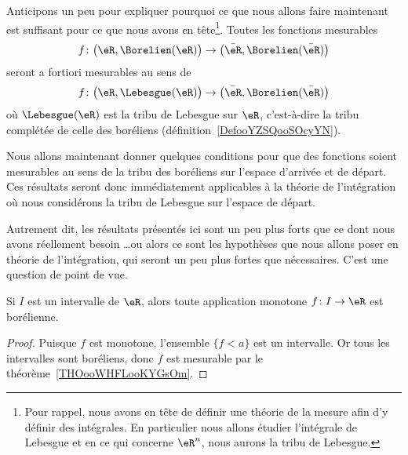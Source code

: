 \begin{normaltext}      \label{NORMooNFOMooYnaflN}
	Anticipons un peu pour expliquer pourquoi ce que nous allons faire maintenant est suffisant pour ce que nous avons en tête\footnote{Pour rappel, nous avons en tête de définir une théorie de la mesure afin d'y définir des intégrales. En particulier nous allons étudier l'intégrale de Lebesgue et en ce qui concerne \( \eR^n\), nous aurons la tribu de Lebesgue.}. Toutes les fonctions mesurables
	\begin{equation}
		f\colon \big( \eR,\Borelien(\eR) \big)\to \big( \bar\eR,\Borelien(\bar \eR) \big)
	\end{equation}
	seront a fortiori mesurables au sens de
	\begin{equation}
		f\colon \big( \eR,\Lebesgue(\eR) \big)\to \big( \bar\eR,\Borelien(\bar \eR) \big)
	\end{equation}
	où \( \Lebesgue(\eR)\) est la tribu de Lebesgue sur \( \eR\), c'est-à-dire la tribu complétée de celle des boréliens (définition~\ref{DefooYZSQooSOcyYN}).
\end{normaltext}

\begin{normaltext}
	Nous allons maintenant donner quelques conditions pour que des fonctions soient mesurables au sens de la tribu des boréliens sur l'espace d'arrivée et de départ. Ces résultats seront donc immédiatement applicables à la théorie de l'intégration où nous considérons la tribu de Lebesgue sur l'espace de départ.

	Autrement dit, les résultats présentés ici sont un peu plus forts que ce dont nous avons réellement besoin \ldots ou alors ce sont les hypothèses que nous allons poser en théorie de l'intégration, qui seront un peu plus fortes que nécessaires. C'est une question de point de vue.
\end{normaltext}

\begin{corollary}       \label{CorooJYDVooCrXVun}
	Si \( I\) est un intervalle de \( \eR\), alors toute application monotone \( f\colon I\to \eR\) est borélienne.
\end{corollary}

\begin{proof}
	Puisque \( f\) est monotone, l'ensemble \( \{ f<a \}\) est un intervalle. Or tous les intervalles sont boréliens, donc \( f\) est mesurable par le théorème~\ref{THOooWHFLooKYGsOm}.
\end{proof}


